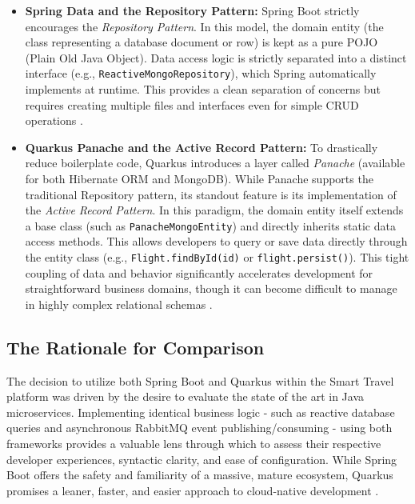 \begin{itemize}
    \item \textbf{Spring Data and the Repository Pattern:} Spring Boot strictly encourages the \textit{Repository Pattern}. In this model, the domain entity (the class representing a database document or row) is kept as a pure \gls{POJO} (Plain Old Java Object). Data access logic is strictly separated into a distinct interface (e.g., \texttt{ReactiveMongoRepository}), which Spring automatically implements at runtime. This provides a clean separation of concerns but requires creating multiple files and interfaces even for simple CRUD operations \cite{spring_data_overview}.
    
    \item \textbf{Quarkus Panache and the Active Record Pattern:} To drastically reduce boilerplate code, Quarkus introduces a layer called \textit{Panache} (available for both Hibernate ORM and MongoDB). While Panache supports the traditional Repository pattern, its standout feature is its implementation of the \textit{Active Record Pattern}. In this paradigm, the domain entity itself extends a base class (such as \texttt{PanacheMongoEntity}) and directly inherits static data access methods. This allows developers to query or save data directly through the entity class (e.g., \texttt{Flight.findById(id)} or \texttt{flight.persist()}). This tight coupling of data and behavior significantly accelerates development for straightforward business domains, though it can become difficult to manage in highly complex relational schemas \cite{quarkus_panache_mongodb}.
\end{itemize}

\subsection{The Rationale for Comparison}

The decision to utilize both Spring Boot and Quarkus within the Smart Travel platform was driven by the desire to evaluate the state of the art in Java microservices. Implementing identical business logic - such as reactive database queries and asynchronous RabbitMQ event publishing/consuming - using both frameworks provides a valuable lens through which to assess their respective developer experiences, syntactic clarity, and ease of configuration. While Spring Boot offers the safety and familiarity of a massive, mature ecosystem, Quarkus promises a leaner, faster, and easier approach to cloud-native development \cite{brilworks_framework_comparison}.

